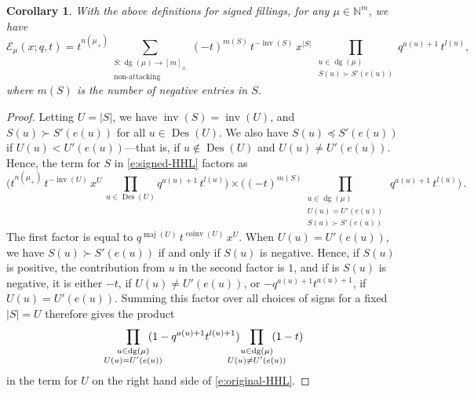 \documentclass[12pt]{amsart}
\newtheorem{cor}[thm]{Corollary}
\theoremstyle{definition}
\theoremstyle{remark}
\newcommand{\NN}{{\mathbb N}}
\newcommand{\Ecal}{{\mathcal E}}
\newcommand{\sgngt}{\succ}
\newcommand{\sgnle}{\preccurlyeq}
\DeclareMathOperator{\dg}{dg}
\DeclareMathOperator{\inv}{inv}
\DeclareMathOperator{\coinv}{coinv}
\DeclareMathOperator{\maj}{maj}
\DeclareMathOperator{\Des}{Des}
\begin{document}
\begin{cor}\label{cor:signed-HHL}
With the above definitions for signed fillings, for any $\mu \in \NN
^{m}$, we have
\begin{equation}\label{e:signed-HHL}
\Ecal _{\mu }(x;q,t) = t^{n(\mu _{+})} \sum _{\substack{S \colon \dg
(\mu ) \rightarrow [m]_{\pm }\\
\text{non-attacking}}}  (-t)^{m(S)}\,
t^{-\inv (S)}\, x^{|S|}\,
\!\!\prod _{\substack{u\in \dg (\mu )\\
S(u) \sgngt S'(e(u))}} \!\!\!\! q^{a(u)+1}\, t^{l(u)},
\end{equation}
where $m(S)$ is the number of negative entries in $S$.
\end{cor}

\begin{proof}
Letting $U = |S|$, we have $\inv (S) = \inv (U)$, and $S(u) \sgngt
S'(e(u))$ for all $u\in \Des (U)$.  We also have $S(u) \sgnle
S'(e(u))$ if $U(u) < U'(e(u))$---that is, if $u\not \in \Des (U)$ and
$U(u)\not =U'(e(u))$.  Hence, the term for $S$ in
\eqref{e:signed-HHL} factors as
\begin{equation}\label{e:signed-HHL-factored}
\biggl(
t^{n(\mu _{+})}\, t^{-\inv (U)}\,  x^{U}\, \! \prod _{u\in \Des (U)}
q^{a(u)+1}\, t^{l(u)} \biggr)
\times \biggl((-t)^{m(S)} \!\!\! \prod _{\substack{u\in \dg (\mu )\\
U(u) = U'(e(u))\\
S(u) \sgngt S'(e(u))}} \!\!\!\! \,q^{a(u)+1}\,
t^{l(u)} \biggr)\,.
\end{equation}
The first factor is equal to $q^{\maj (U)}\, t^{\coinv (U)}\, x^{U}$.
When $U(u) = U'(e(u))$, we have $S(u)\sgngt S'(e(u))$ if and only if
$S(u)$ is negative.  Hence, if $S(u)$ is positive, the contribution
from $u$ in the second factor is $1$, and if is $S(u)$ is negative, it
is either $-t$, if $U(u) \not = U'(e(u))$, or $-q^{a(u)+1}t^{a(u)+1}$,
if $U(u) = U'(e(u))$.  Summing this factor over all choices of signs
for a fixed $|S| = U$ therefore gives the product
\begin{equation}\label{e:U-factors}
 \prod _{\substack{u\in \dg (\mu )\\ U(u) = U'(e(u))}}
\hspace{-3ex} (1 - q^{a(u)+1} t^{l(u)+1}) \hspace{-3ex}
\prod _{\substack{u\in \dg (\mu )\\
U(u) \not = U'(e(u))}} \hspace{-3ex} (1-t)
\end{equation}
in the term for $U$ on the right hand side of \eqref{e:original-HHL}.
\end{proof}
\end{document}
